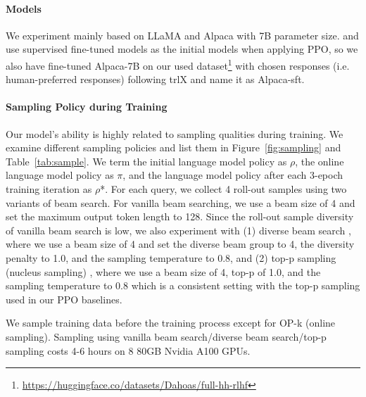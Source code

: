 \paragraph{Models}
We experiment mainly based on LLaMA \cite{touvron2023llama} and Alpaca \cite{alpaca} with 7B parameter size. \citet{instructgpt} and \citet{rl4lms} use supervised fine-tuned models as the initial models when applying PPO, so we also have fine-tuned Alpaca-7B on our used dataset\footnote{\url{https://huggingface.co/datasets/Dahoas/full-hh-rlhf}} with chosen responses (i.e. human-preferred responses) following trlX\cite{trlx} and name it as Alpaca-sft.

\paragraph{Sampling Policy during Training} Our model's ability is highly related to sampling qualities during training. We examine different sampling policies and list them in Figure~\ref{fig:sampling} and Table~\ref{tab:sample}.
We term the initial language model policy as $\rho$, the online language model policy as $\pi$, and the language model policy after each 3-epoch training iteration as $\rho$*. 
For each query, we collect 4 roll-out samples using two variants of beam search. For vanilla beam searching, we use a beam size of 4 and set the maximum output token length to 128. Since the roll-out sample diversity of vanilla beam search is low, we also experiment with (1) diverse beam search \cite{vijayakumar2018diverse}, where we use a beam size of 4 and set the diverse beam group to 4, the diversity penalty to 1.0, and the sampling temperature to 0.8, and (2) top-p sampling (nucleus sampling) \cite{holtzman2020curious}, where we use a beam size of 4, top-p of 1.0, and the sampling temperature to 0.8 which is a consistent setting with the top-p sampling used in our PPO baselines. 

We sample training data before the training process except for OP-k (online sampling). Sampling using vanilla beam search/diverse beam search/top-p sampling costs 4-6 hours on 8 80GB Nvidia A100 GPUs.

